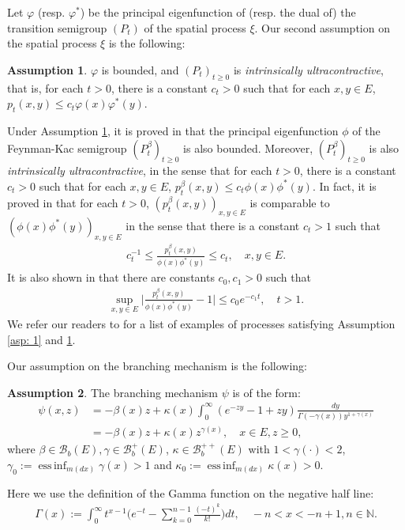 \documentclass[UTF8]{pkuthss}
\theoremstyle{plain}
\theoremstyle{definition}
\newtheorem{asp}{Assumption}[chapter]
\numberwithin{equation}{section}
\begin{document}
	Let $\varphi$ (resp. $\varphi^*$) be the principal eigenfunction of (resp. the dual of) the transition semigroup $(P_t)$ of the spatial process $\xi$.
	Our second assumption on the spatial process $\xi$ is the following:

\begin{asp} \label{asp: 3}
	$\varphi$ is bounded, and $(P_t)_{t\geq 0}$ is \emph{intrinsically ultracontractive}, that is, for each $t>0$, there is a constant $c_t >0$ such that for each $x,y\in E$, $p_t(x,y) \leq c_t \varphi(x) \varphi^*(y)$.
\end{asp}
	
	Under Assumption \ref{asp: 3}, it is proved in \cite{RenSongZhang2015Limit, RenSongZhang2017Central} that the principal eigenfunction $\phi$ of the Feynman-Kac semigroup $(P^\beta_t)_{t\geq 0}$ is also bounded.
	Moreover, $(P^\beta_t)_{t\geq 0}$ is also \emph{intrinsically ultracontractive}, in the sense that for each $t>0$, there is a constant $c_t >0$ such that for each $x,y\in E$, $p^\beta_t(x,y) \leq c_t \phi(x) \phi^*(y)$.
	In fact, it is proved in \cite{KimSong2008Intrinsic} that for each $t>0$, $(p^\beta_t(x,y))_{x,y\in E}$ is comparable to $(\phi(x)\phi^*(y))_{x,y\in E}$ in the sense that there is a constant $c_t > 1$ such that
\begin{align}\label{eq: p-t-beta is comparable to phi phi-star}
	c_t^{-1}
	\leq \frac {p^\beta_t(x,y)} {\phi(x)\phi^*(y)}
	\leq c_t,
	\quad x,y \in E.
\end{align}
    It is also shown in \cite{KimSong2008Intrinsic} that there are constants $c_0, c_1 > 0$ such that
\begin{align}\label{eq:q(t,x,y)}
	\sup_{x,y\in E} \Big|\frac{p^\beta_t(x,y)}{\phi(x)\phi^*(y)} - 1 \Big|
	\leq c_0 e^{-c_1 t},
	\quad t > 1.
\end{align}
	We refer our readers to \cite{RenSongZhang2015Limit} for a list of examples of processes satisfying Assumption \ref{asp: 1} and \ref{asp: 3}.

	Our assumption on the branching mechanism is the following:
\begin{asp} \label{asp: 4}
	The branching mechanism $\psi$ is of the form:
\begin{align}
	\psi(x,z)
	&= - \beta(x) z + \kappa(x) \int_0^\infty (e^{-z y} - 1+ z y) \frac{dy}{\Gamma(- \gamma(x)) y^{1+ \gamma(x)}}
	\\&= -\beta (x) z + \kappa(x) z^{\gamma(x)},
	\quad x\in E, z \geq 0,
\end{align}
	where $\beta \in \mathscr B_b(E), \gamma \in \mathscr B^+_b(E)$, $\kappa \in \mathscr B^{++}_b(E)$ with $1< \gamma(\cdot )<2$, $\gamma_0 := \operatorname{ess\,inf}_{m(dx)} \gamma(x)> 1$ and $\kappa_0:=\operatorname{ess\,inf}_{m(dx)}\kappa(x) > 0$.
\end{asp}
	Here we use the definition of the Gamma function on the negative half line:
\begin{align}\label{eq: definition of Gamma function}
	\Gamma(x)
	:= \int_0^\infty t^{x-1} \Big(e^{-t} - \sum_{k=0}^{n-1} \frac{(-t)^k}{k!}\Big) dt,
	\quad -n< x< -n+1, n\in \mathbb N.
\end{align}
	
\end{document}
